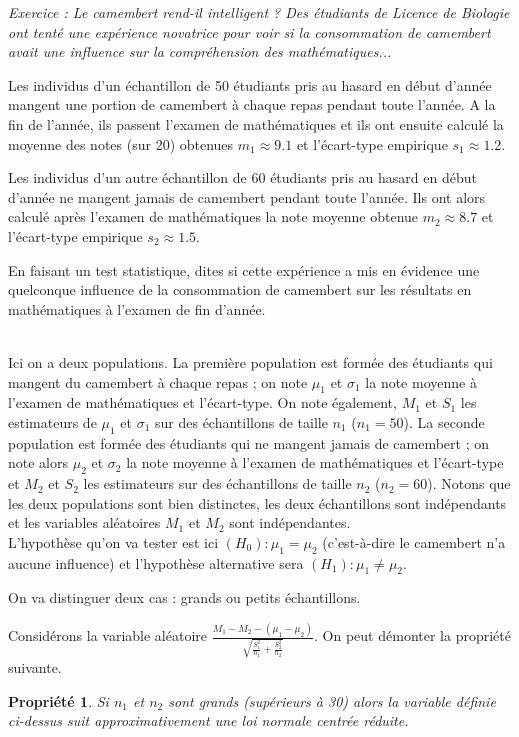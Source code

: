 \documentclass[12pt, a4paper]{book}
\newtheorem{prop}[thm]{Propriété}
\numberwithin{equation}{section}
\begin{document}
{\it Exercice : Le camembert rend-il intelligent ?
Des étudiants de Licence de Biologie ont tenté une expérience novatrice pour voir si la consommation de 
camembert avait une influence sur la compréhension des mathématiques...

Les individus d'un échantillon de 50 étudiants pris au hasard en début d'année mangent une portion de 
camembert à chaque repas pendant toute l'année. 
A la fin de l'année, ils passent l'examen de mathématiques et ils ont ensuite calculé la moyenne des 
notes (sur 20) obtenues $m_1\approx 9.1$ et l'écart-type empirique $s_1\approx 1.2$.

Les individus d'un autre échantillon de 60 étudiants pris au hasard en début d'année ne mangent jamais de 
camembert pendant toute l'année. Ils ont alors calculé après l'examen de mathématiques la note moyenne 
obtenue $m_2\approx 8.7$ et l'écart-type empirique $s_2\approx 1.5$.

En faisant un test statistique, dites si cette expérience a mis en évidence une quelconque 
influence de la consommation de camembert sur les résultats en mathématiques à l'examen de fin d'année.}\\

Ici on a deux populations. La première population est formée des étudiants qui mangent du camembert à chaque
repas ; on note $\mu_1$ et $\sigma_1$ la note moyenne à l'examen de mathématiques et l'écart-type. On note
également, $M_1$ et $S_1$ les estimateurs de $\mu_1$ et $\sigma_1$ sur des échantillons de taille $n_1$
($n_1=50$). La seconde population est formée des étudiants qui ne mangent jamais de camembert ; on note
alors $\mu_2$ et $\sigma_2$ la note moyenne à l'examen de mathématiques et l'écart-type et $M_2$ et $S_2$ 
les estimateurs sur des échantillons de taille $n_2$ ($n_2=60$).
Notons que les deux populations sont bien distinctes, les deux échantillons sont indépendants et les variables aléatoires $M_1$ et $M_2$ sont indépendantes.\\


L'hypothèse qu'on va tester est ici $(H_0) : \mu_1=\mu_2$ (c'est-à-dire le camembert n'a aucune influence) et l'hypothèse alternative sera $(H_1) : \mu_1\neq\mu_2$.


On va distinguer deux cas : grands ou petits échantillons.\\


Considérons la variable aléatoire 
$\displaystyle 
\frac{M_1-M_2 - (\mu_1-\mu_2)}{\sqrt{\frac{S_1^2}{n_1}+\frac{S_2^2}{n_2}} }
$.
On peut démonter la propriété suivante.
\begin{prop}
Si $n_1$ et $n_2$ sont grands (supérieurs à 30) alors la variable %
définie ci-dessus 
suit approximativement une loi normale centrée réduite.
\end{prop}
\end{document}
